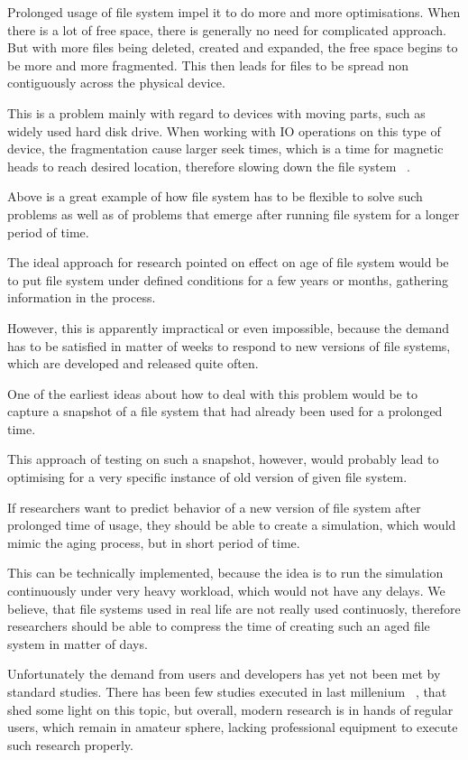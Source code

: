 \documentclass[color]{fithesis3}
\begin{document}
Prolonged usage of file system impel it to do more and more optimisations. When there is a lot of free space, there is generally no need for complicated approach. But with more files being deleted, created and expanded, the free space begins to be more and more fragmented. This then leads for files to be spread non contiguously across the physical device.

This is a problem mainly with regard to devices with moving parts, such as widely used hard disk drive. When working with IO operations on this type of device, the fragmentation cause larger seek times, which is a time for magnetic heads to reach desired location, therefore slowing down the file system ~\cite{windows2006:qhe}.

Above is a great example of how file system has to be flexible to solve such problems as well as of problems that emerge after running file system for a longer period of time.

The ideal approach for research pointed on effect on age of file system would be to put file system under defined conditions for a few years or months, gathering information in the process. 

However, this is apparently impractical or even impossible, because the demand has to be satisfied in matter of weeks to respond to new versions of file systems, which are developed and released quite often.

One of the earliest ideas about how to deal with this problem would be to capture a snapshot of a file system that had already been used for a prolonged time. 

This approach of testing on such a snapshot, however, would probably lead to optimising for a very specific instance of old version of given file system. 

If researchers want to predict behavior of a new version of file system after prolonged time of usage, they should be able to create a simulation, which would mimic the aging process, but in short period of time.

This can be technically implemented, because the idea is to run the simulation continuously under very heavy workload, which would not have any delays. We believe, that file systems used in real life are not really used continuosly, therefore researchers should be able to compress the time of creating such an aged file system in matter of days.

Unfortunately the demand from users and developers has yet not been met by standard studies. There has been few studies executed in last millenium ~\cite{harvardaging:qhe}, that shed some light on this topic, but overall, modern research is in hands of regular users, which remain in amateur sphere, lacking professional equipment to execute such research properly.
\end{document}
